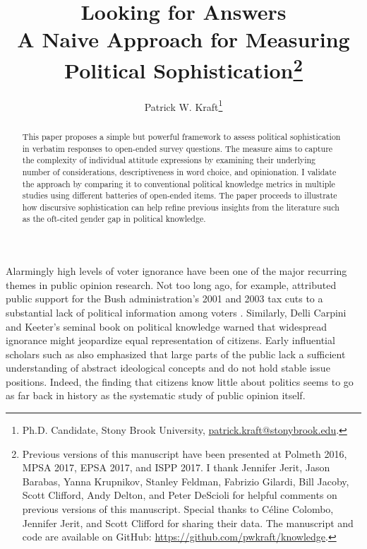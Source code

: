\documentclass[12pt]{article}
\author{Patrick W. Kraft\footnote{Ph.D. Candidate, Stony Brook University, \href{mailto:patrick.kraft@stonybrook.edu}{patrick.kraft@stonybrook.edu}.
}}
\title{Looking for Answers\\ %
\large{A Naive Approach for Measuring Political Sophistication}\footnote{Previous versions of this manuscript have been presented at Polmeth 2016, MPSA 2017, EPSA 2017, and ISPP 2017. I thank Jennifer Jerit, Jason Barabas, Yanna Krupnikov, Stanley Feldman, Fabrizio Gilardi, Bill Jacoby, Scott Clifford, Andy Delton, and Peter DeScioli for helpful comments on previous versions of this manuscript. Special thanks to C{\'e}line Colombo, Jennifer Jerit, and Scott Clifford for sharing their data. The manuscript and code are available on GitHub: \url{https://github.com/pwkraft/knowledge}. %
}
}
\date{}
\begin{document}
\maketitle
\doublespacing
\thispagestyle{empty}


\hfill
\begin{abstract}\singlespacing
This paper proposes a simple but powerful framework to assess political sophistication in verbatim responses to open-ended survey questions. The measure aims to capture the complexity of individual attitude expressions by examining their underlying number of considerations, descriptiveness in word choice, and opinionation. I validate the approach by comparing it to conventional political knowledge metrics in multiple studies using different batteries of open-ended items. The paper proceeds to illustrate how discursive sophistication can help refine previous insights from the literature such as the oft-cited gender gap in political knowledge.


\end{abstract}
\hfill
\newpage\setcounter{page}{1}



Alarmingly high levels of voter ignorance have been one of the major recurring themes in public opinion research. Not too long ago, for example, \citet{bartels2005homer} attributed public support for the Bush administration's 2001 and 2003 tax cuts to a substantial lack of political information among voters \citep[but see][]{lupia2007were,bartels2007homer}. Similarly, Delli Carpini and Keeter's \citeyearpar{carpini1996americans} seminal book on political knowledge warned that widespread ignorance might jeopardize equal representation of citizens. Early influential scholars such as \citet{converse1964nature} also emphasized that large parts of the public lack a sufficient understanding of abstract ideological concepts and do not hold stable issue positions. Indeed, the finding that citizens know little about politics seems to go as far back in history as the systematic study of public opinion itself.
\end{document}
